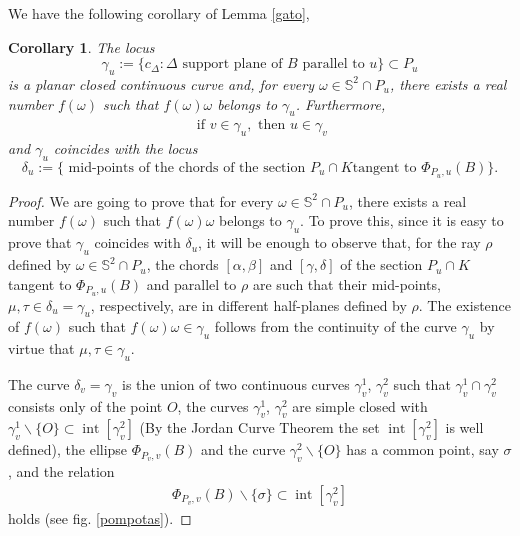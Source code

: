 \documentclass[12pt]{amsart}
\newcommand{\inte}{\operatorname*{int}}
\newtheorem{corollary}{Corollary}
\begin{document}
We have the following corollary of Lemma \ref{gato}, 
 \begin{corollary}\label{abejita}                
The locus 
\[
\gamma_u:=\{c_\Delta: \Delta \textrm{ support plane of } B \textrm{ parallel to }u\}\subset P_u
\] 
                    is a planar closed continuous curve and, for every 
                    $\omega \in \mathbb{S}^2\cap P_u$, there exists a real number $f(\omega)$ 
                    such that $  f(\omega)\omega$ 
                    belongs to $\gamma_u$. Furthermore,   
\begin{eqnarray}\label{perro}
\textrm{ if } v\in \gamma_u,  \textrm{ then }u\in \gamma_v  
\end{eqnarray}            
and $\gamma_u$ coincides with the locus
\[
\delta_u:=\{ \textrm{ mid-points of the chords of the section }P_u\cap K \textrm{tangent to }\Phi_{P_u, u}(B)\}.
\]
 \end{corollary}    
\begin{proof}
                    We are going to prove that for every $\omega \in \mathbb{S}^2\cap P_u$, there exists 
                    a real number $f(\omega)$ such that $  f(\omega)\omega$ belongs to $\gamma_u$. 
                    To prove this, since it is easy to prove that $\gamma_u$ coincides with 
                    $\delta_u$, it will be enough to observe that, for the ray $\rho$ defined by 
                    $\omega \in \mathbb{S}^2\cap P_u$, the chords $[\alpha,\beta]$ and 
                    $[\gamma, \delta]$ of the section $P_u\cap K$ 
                    tangent to $\Phi_{P_u, u}(B)$ and parallel to $\rho$ are such that their mid-points, 
                    $ \mu,\tau\in \delta_u=\gamma_u$, respectively, are in different half-planes defined by 
                    $\rho$. The existence of $f(\omega)$ such that $ f(\omega)\omega \in \gamma_u$ 
                    follows from the continuity of the curve $\gamma_u$ by virtue that 
                    $ \mu, \tau \in \gamma_u$.
                     
                    The curve $\delta_{v}=\gamma_{v}$ is the union of two continuous curves 
                  $\gamma_{v}^1$, $\gamma_{v}^2$ such that 
                  $\gamma_{v}^1 \cap \gamma_{v}^2$ consists only of the point $O$, the curves 
                  $\gamma_{v}^1$, $ \gamma_{v}^2$ are simple closed with
                  $\gamma_{v}^1\backslash \{O\}\subset \inte [\gamma_{v}^2]$ (By the Jordan Curve 
                  Theorem \cite{Hales} the set 
                   $\inte [\gamma_{v}^2]$ is well defined), the ellipse 
                  $\Phi_{P_{v}, {v}}(B)$ and the curve $\gamma_{v}^2 \backslash \{O\}$ has a 
                  common point, say $\sigma$, and the relation 
\begin{eqnarray}\label{collelle}
 \Phi_{P_{v}, {v}}(B) \backslash \{\sigma\} \subset \inte [\gamma_{v}^2]
\end{eqnarray} 
                   holds (see fig. \ref{pompotas}). 
         \end{proof}
          
\end{document}
